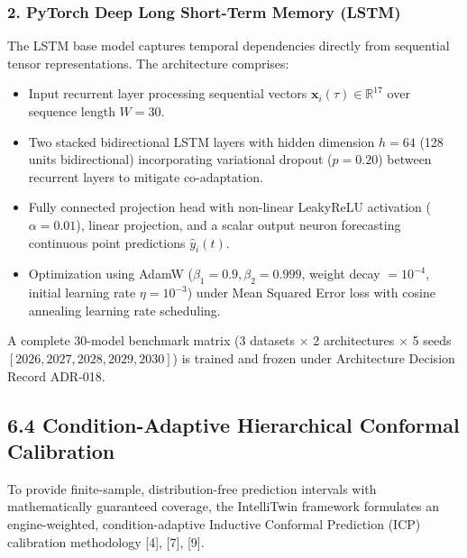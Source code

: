 \documentclass[12pt,a4paper]{article}
\begin{document}
\subsubsection*{2. PyTorch Deep Long Short-Term Memory (LSTM)}
The LSTM base model captures temporal dependencies directly from sequential tensor representations. The architecture comprises:
\begin{itemize}
    \item Input recurrent layer processing sequential vectors $\mathbf{x}_i(\tau) \in \mathbb{R}^{17}$ over sequence length $W = 30$.
    \item Two stacked bidirectional LSTM layers with hidden dimension $h = 64$ (128 units bidirectional) incorporating variational dropout ($p = 0.20$) between recurrent layers to mitigate co-adaptation.
    \item Fully connected projection head with non-linear LeakyReLU activation ($\alpha = 0.01$), linear projection, and a scalar output neuron forecasting continuous point predictions $\hat{y}_i(t)$.
    \item Optimization using AdamW ($\beta_1 = 0.9, \beta_2 = 0.999$, weight decay $= 10^{-4}$, initial learning rate $\eta = 10^{-3}$) under Mean Squared Error loss with cosine annealing learning rate scheduling.
\end{itemize}

A complete 30-model benchmark matrix (3 datasets $\times$ 2 architectures $\times$ 5 seeds $[2026, 2027, 2028, 2029, 2030]$) is trained and frozen under Architecture Decision Record ADR-018.

\subsection*{6.4 Condition-Adaptive Hierarchical Conformal Calibration}
To provide finite-sample, distribution-free prediction intervals with mathematically guaranteed coverage, the IntelliTwin framework formulates an engine-weighted, condition-adaptive Inductive Conformal Prediction (ICP) calibration methodology [4], [7], [9].
\end{document}
